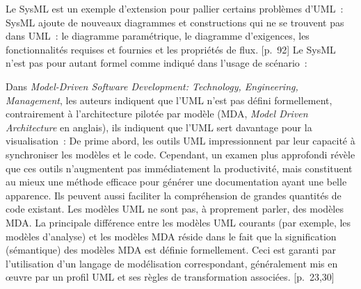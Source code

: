 {Le SysML est un exemple d'extension pour pallier certains problèmes d'UML~:
{SysML ajoute de nouveaux diagrammes et constructions qui ne se trouvent pas dans UML~: le diagramme paramétrique, le diagramme d’exigences, les fonctionnalités requises et fournies et les propriétés de flux.}
{[p.~92]}
Le SysML n'est pas pour autant formel comme indiqué dans l'usage de scénario~:

Dans \textit{Model-Driven Software Development: Technology, Engineering, Management}, les auteurs indiquent que l'UML n'est pas défini formellement, contrairement à l'architecture pilotée par modèle (MDA, \textit{Model Driven Architecture} en anglais), ils indiquent que l'UML sert davantage pour la visualisation~:
 {
De prime abord, les outils UML impressionnent par leur capacité à synchroniser les modèles et le code. Cependant, un examen plus approfondi révèle que ces outils n'augmentent pas immédiatement la productivité, mais constituent au mieux une méthode efficace pour générer une documentation ayant une belle apparence. Ils peuvent aussi faciliter la compréhension de grandes quantités de code existant.
\elide
Les modèles UML ne sont pas, à proprement parler, des modèles MDA. La principale différence entre les modèles UML courants (par exemple, les modèles d'analyse) et les modèles MDA réside dans le fait que la signification (sémantique) des modèles MDA est définie formellement. Ceci est garanti par l'utilisation d'un langage de modélisation correspondant, généralement mis en œuvre par un profil UML et ses règles de transformation associées.} {[p.~23,30]}

}{}

